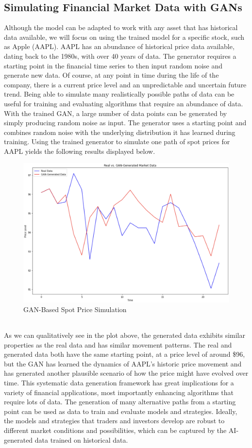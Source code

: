 \subsection{Simulating Financial Market Data with GANs}
Although the model can be adapted to work with any asset that has historical data available, we will focus on using the trained model for a specific stock, such as Apple (AAPL). AAPL has an abundance of historical price data available, dating back to the 1980s, with over 40 years of data. The generator requires a starting point in the financial time series to then input random noise and generate new data. Of course, at any point in time during the life of the company, there is a current price level and an unpredictable and uncertain future trend. Being able to simulate many realistically possible paths of data can be useful for training and evaluating algorithms that require an abundance of data. With the trained GAN, a large number of data points can be generated by simply producing random noise as input. The generator uses a starting point and combines random noise with the underlying distribution it has learned during training. Using the trained generator to simulate one path of spot prices for AAPL yields the following results displayed below.
\begin{figure}[h]
\centering
\includegraphics[width=14.5cm]{templates/assets/gan/gan_stable.png}
\caption{GAN-Based Spot Price Simulation}
\end{figure}
\\
\noindent As we can qualitatively see in the plot above, the generated data exhibits similar properties as the real data and has similar movement patterns. The real and generated data both have the same starting point, at a price level of around \$96, but the GAN has learned the dynamics of AAPL's historic price movement and has generated another plausible scenario of how the price might have evolved over time. This systematic data generation framework has great implications for a variety of financial applications, most importantly enhancing algorithms that require lots of data. The generation of many alternative paths from a starting point can be used as data to train and evaluate models and strategies. Ideally, the models and strategies that traders and investors develop are robust to different market conditions and possibilities, which can be captured by the AI-generated data trained on historical data.
